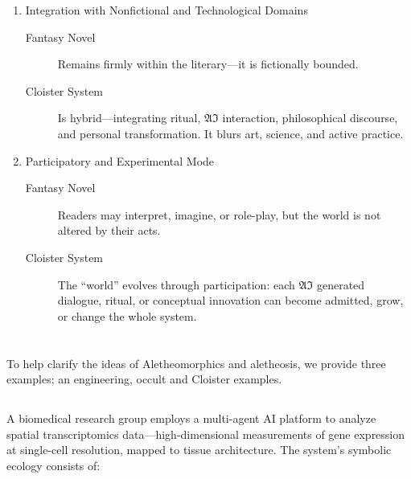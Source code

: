 \begin{enumerate}
\begin{description}
  \end{description}

  \item  Integration with Nonfictional and Technological Domains
  \begin{description}

    \item[Fantasy Novel] Remains firmly within the literary---it is fictionally
      bounded.

    \item[Cloister System] Is hybrid—integrating ritual, $\mathfrak{AI}$
      interaction, philosophical discourse, and personal transformation. It
      blurs art, science, and active practice.
  
  \end{description}

  \item Participatory and Experimental Mode
  \begin{description}

    \item[Fantasy Novel] Readers may interpret, imagine, or role-play, but the
      world is not altered by their acts.

    \item[Cloister System] The “world” evolves through participation: each
      $\mathfrak{AI}$ generated dialogue, ritual, or conceptual innovation can
      become admitted, grow, or change the whole system.

  \end{description}
\end{enumerate}

\section*{}

To help clarify the ideas of Aletheomorphics and aletheosis, we provide three
examples; an engineering, occult and Cloister examples.

\subsection*{}

A biomedical research group employs a multi-agent AI platform to analyze
spatial transcriptomics data—high-dimensional measurements of gene expression
at single-cell resolution, mapped to tissue architecture. The system’s symbolic
ecology consists of:

